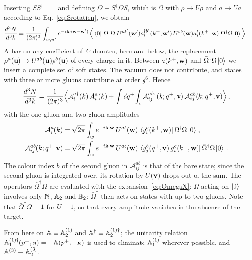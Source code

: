 Inserting $SS^\dagger=1$ and defining $\bar\Omega\equiv S^\dagger\Omega S$, which is $\Omega$ with $\rho\to U\rho$ and $a\to Ua$ according to Eq.~\eqref{eq:Srotation}, we obtain
\begin{align}
\frac{d^3N}{d^3k}=\frac{1}{(2\pi)^3}\int_{w,w'}e^{-i\mathbf{k}\cdot(\mathbf{w}-\mathbf{w}')}\,\Big\langle\bra0\,\Omega^\dagger\bar\Omega\;U^{ab'}(\mathbf{w}')a^{\dagger b'}_i(k^+,\mathbf{w}')\,U^{ab}(\mathbf{w})a^b_i(k^+,\mathbf{w})\;\bar\Omega^\dagger\Omega\ket0\Big\rangle\,.
\end{align}
A bar on any coefficient of $\Omega$ denotes, here and below, the replacement $\rho^a(\mathbf{u})\to U^{ab}(\mathbf{u})\rho^b(\mathbf{u})$ of every charge in it. Between $a(k^+,\mathbf{w})$ and $\bar\Omega^\dagger\Omega\ket0$ we insert a complete set of soft states. The vacuum does not contribute, and states with three or more gluons contribute at order $g^6$. Hence
\begin{align}\label{eq:N_amplitudes}
\frac{d^3N}{d^3k}=\frac{1}{(2\pi)^3}\Big\langle\mathcal A^{a\dagger}_i(k)\,\mathcal A^a_i(k)+\int dq^+\!\int_{v}\mathcal A^{ab\dagger}_{ij}(k;q^+,\mathbf{v})\,\mathcal A^{ab}_{ij}(k;q^+,\mathbf{v})\Big\rangle\,,
\end{align}
with the one-gluon and two-gluon amplitudes
\begin{align}\label{eq:amplitudes_def}
\mathcal A^a_i(k)&=\sqrt{2\pi}\int_{w}e^{-i\mathbf{k}\cdot\mathbf{w}}\,U^{ab}(\mathbf{w})\,\bra{g^b_i(k^+,\mathbf{w})}\bar\Omega^\dagger\Omega\ket0\,,\notag\\
\mathcal A^{ab}_{ij}(k;q^+,\mathbf{v})&=\sqrt{2\pi}\int_{w}e^{-i\mathbf{k}\cdot\mathbf{w}}\,U^{ac}(\mathbf{w})\,\bra{g^b_j(q^+,\mathbf{v})\,g^c_i(k^+,\mathbf{w})}\bar\Omega^\dagger\Omega\ket0\,.
\end{align}
The colour index $b$ of the second gluon in $\mathcal A^{ab}_{ij}$ is that of the bare state; since the second gluon is integrated over, its rotation by $U(\mathbf{v})$ drops out of the sum. The operators $\bar\Omega^\dagger\Omega$ are evaluated with the expansion~\eqref{eq:OmegaX}: $\Omega$ acting on $\ket0$ involves only $\mathbb{N}$, $\mathbb{A}_2$ and $\mathbb{B}_2$; $\bar\Omega^\dagger$ then acts on states with up to two gluons. Note that $\bar\Omega^\dagger\Omega=1$ for $U=1$, so that every amplitude vanishes in the absence of the target.

From here on $\mathbb{A}\equiv\mathbb{A}^{(1)}_2$ and $\mathbb{A}^\dagger\equiv\mathbb{A}^{(1)\dagger}_2$; the unitarity relation $\mathbb{A}^{(1)\dagger}_1(p^+,\mathbf{x})=-\mathbb{A}(p^+,-\mathbf{x})$ is used to eliminate $\mathbb{A}^{(1)}_1$ wherever possible, and $\mathbb{A}^{(3)}\equiv\mathbb{A}^{(3)}_2$.

